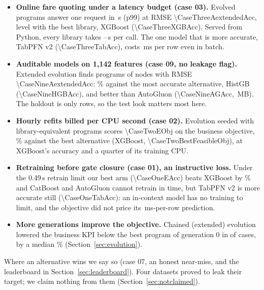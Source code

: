 \documentclass[10.5pt]{article}
\begin{document}
\begin{itemize}
\item \textbf{Online fare quoting under a latency budget (case 03).} Evolved programs answer one request in
\CaseThreeAextendedRes\,\textmu s (p99) at RMSE \num{\CaseThreeAextendedAcc}, level with the best library, XGBoost
(\num{\CaseThreeXGBAcc}). Served from Python, every library takes \CaseThreeLibPNinetyNineMin--\CaseThreeLibPNinetyNineMax\,\textmu s per call.
The one model that is more accurate, TabPFN v2 (\num{\CaseThreeTabAcc}), costs \CaseThreeTabMsRow\,ms per row even in batch.
\item \textbf{Auditable models on 1{,}142 features (case 09, no leakage flag).} Extended evolution finds programs of
\CaseNineXNodes{} nodes with RMSE \num{\CaseNineAextendedAcc}: \CaseNineVsHGB\% against the most accurate alternative,
HistGB (\num{\CaseNineHGBAcc}), and better than AutoGluon (\num{\CaseNineAGAcc}, \CaseNineAGMB\,MB). The holdout is only
\CaseNineHoldRows{} rows, so the test look matters most here.
\item \textbf{Hourly refits billed per CPU second (case 02).} Evolution seeded with library-equivalent programs scores
\num{\CaseTwoEObj} on the business objective, \CaseTwoEVsBest\% against the best alternative (XGBoost, \num{\CaseTwoBestFeasibleObj}),
at XGBoost's accuracy and a quarter of its training CPU.
\item \textbf{Retraining before gate closure (case 01), an instructive loss.} Under the 0.49\,s retrain limit our best arm
(\num{\CaseOneEAcc}) beats XGBoost by \CaseOneEVsXGB\% and CatBoost and AutoGluon cannot retrain in time, but TabPFN v2 is
more accurate still (\num{\CaseOneTabAcc}): an in-context model has no training to limit, and the objective did not price
its \CaseOneTabMsRow\,ms-per-row prediction.
\item \textbf{More generations improve the objective.} Chained (extended) evolution lowered the business KPI below the best program of
generation 0 in \EvoXImproved{} of \EvoXCases{} cases, by a median \EvoMedianXGain\% (Section~\ref{sec:evolution}).
\end{itemize}
Where an alternative wins we say so (case 07, an honest near-miss, and the leaderboard in Section~\ref{sec:leaderboard}).
Four datasets proved to leak their target; we claim nothing from them (Section~\ref{sec:notclaimed}).
\end{document}
